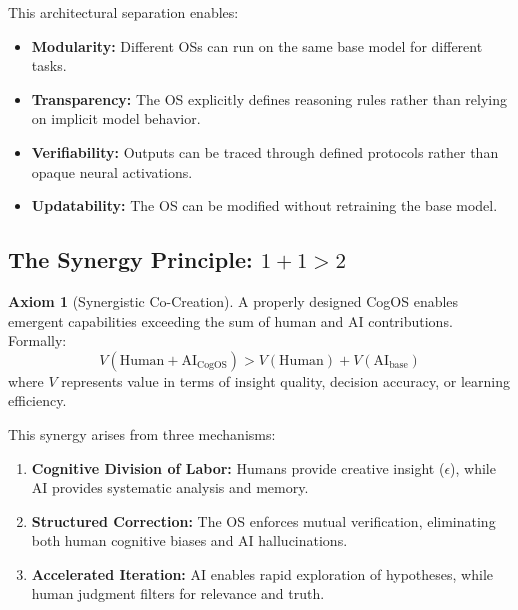\documentclass[11pt,a4paper]{article}
\theoremstyle{definition}
\newtheorem{axiom}{Axiom}[section]
\theoremstyle{remark}
\begin{document}
This architectural separation enables:
\begin{itemize}
    \item \textbf{Modularity:} Different OSs can run on the same base model for different tasks.
    \item \textbf{Transparency:} The OS explicitly defines reasoning rules rather than relying on implicit model behavior.
    \item \textbf{Verifiability:} Outputs can be traced through defined protocols rather than opaque neural activations.
    \item \textbf{Updatability:} The OS can be modified without retraining the base model.
\end{itemize}

\subsection{The Synergy Principle: $1+1>2$}

\begin{axiom}[Synergistic Co-Creation]
A properly designed CogOS enables emergent capabilities exceeding the sum of human and AI contributions. Formally:
\[
V(\text{Human} + \text{AI}_{\text{CogOS}}) > V(\text{Human}) + V(\text{AI}_{\text{base}})
\]
where $V$ represents value in terms of insight quality, decision accuracy, or learning efficiency.
\end{axiom}

This synergy arises from three mechanisms:

\begin{enumerate}
    \item \textbf{Cognitive Division of Labor:} Humans provide creative insight ($\epsilon$), while AI provides systematic analysis and memory.
    
    \item \textbf{Structured Correction:} The OS enforces mutual verification, eliminating both human cognitive biases and AI hallucinations.
    
    \item \textbf{Accelerated Iteration:} AI enables rapid exploration of hypotheses, while human judgment filters for relevance and truth.
\end{enumerate}
\end{document}
